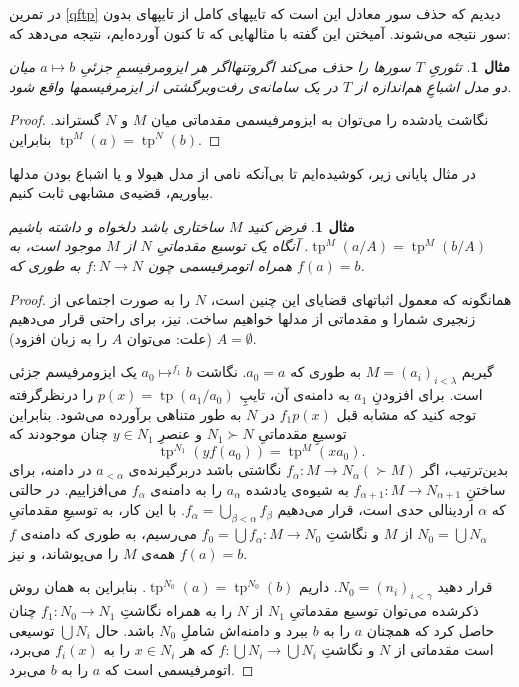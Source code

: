 \documentclass[12pt,a4paper]{report}
\theoremstyle{colorhead}
\newtheorem{mesal}[thm]{مثال}
\DeclareMathOperator{\tp}{tp}
\begin{document}
در تمرین 
\ref{qftp}
 دیدیم که حذف سور معادل این است که تایپهای کامل از تایپهای بدون سور نتیجه می‌شوند. آمیختن این گفته با مثالهایی که تا کنون آورده‌ایم، نتیجه می‌دهد که:
\begin{mesal}
تئوریِ
$T$
سورها را حذف می‌کند اگروتنهااگر هر ایزومرفیسمِ
جزئیِ
$a\mapsto b$
میان دو مدل اشباعِ هم‌اندازه از
$T$
در یک سامانه‌ی رفت‌وبرگشتی از ایزمرفیسمها واقع شود.
\end{mesal}
\begin{proof}
نگاشت یادشده را می‌توان به ایزومرفیسمی مقدماتی میان
$M$
و 
$N$
گستراند. بنابراین
$\tp^M(a)=\tp^N(b)$.
\end{proof}
در مثال پایانی زیر، کوشیده‌ایم تا بی‌آنکه نامی از مدل هیولا و یا اشباع بودن مدلها بیاوریم، قضیه‌ی مشابهی ثابت کنیم.
\begin{mesal}
فرض کنید
$M$
ساختاری باشد دلخواه  و داشته باشیم
$\tp^M(a/A)=\tp^M(b/A)$.
آنگاه یک توسیع مقدماتیِ
$N$
از
$M$
موجود است، به همراه اتومرفیسمی چون
$f:N\to N$
به طوری که
$f(a)=b$.
\end{mesal}
\begin{proof}
همانگونه که معمول اثباتهای قضایای این چنین است،
$N$
را به صورت اجتماعی از زنجیری شمارا و مقدماتی از مدلها خواهیم ساخت. نیز، برای راحتی
قرار می‌دهیم
$A=\emptyset$
(علت: می‌توان 
$A$
را به زبان افزود).
\par 
گیریم
$M=(a_i)_{i<\lambda}$
به طوری که
$a_0=a$.
نگاشت
$a_0\mapsto^{f_1} b$
یک ایزومرفیسم جزئی است. برای افزودنِ
$a_1$
به دامنه‌ی آن، تایپِ
$p(x)=\tp(a_1/a_0)$
را درنظرگرفته توجه کنید که مشابه قبل
$f_1p(x)$
در
$N$
به طور متناهی برآورده می‌شود. بنابراین توسیعِ مقدماتیِ
$N_1\succ N$
و عنصرِ
$y\in N_1$
چنان موجودند که 
\[
\tp^{N_1}(yf(a_0))=\tp^M( xa_0).
\]
بدین‌ترتیب، اگر
$f_\alpha:M\to N_\alpha (\succ M)$
نگاشتی باشد دربرگیرنده‌ی
$a_{<\alpha}$
در دامنه، برای ساختنِ
$f_{\alpha+1}:M\to N_{\alpha+1}$
به شیوه‌ی یادشده
$a_\alpha$
را به دامنه‌ی
$f_\alpha$
می‌افزاییم. در حالتی که
$\alpha$
اردینالی حدی است، قرار می‌‌دهیم
$f_\alpha=\bigcup_{\beta<\alpha} f_\beta$.
با این کار،‌ به توسیعِ مقدماتیِ
$N_0=\bigcup N_\alpha$
از
$M$
و نگاشتِ
$f_0=\bigcup f_\alpha:M\to N_0$
می‌رسیم، به طوری که
دامنه‌ی
$f$
همه‌ی
$M$
را می‌پوشاند، و نیز
$f(a)=b$.
\par
قرار دهید
$N_0=(n_i)_{i<\gamma}$.
داریم
$\tp^{N_0}(a)=\tp^{N_0}(b)$.
بنابراین به همان روش ذکرشده می‌توان توسیع مقدماتیِ
$N_1$
از 
$N$
را به همراه نگاشتِ
$f_1:N_0\to N_1$
چنان حاصل کرد که
همچنان
$a$
را به
$b$
ببرد و دامنه‌اش شاملِ
$N_0$
باشد. حال
$\bigcup N_i$
توسیعی است مقدماتی از
$N$
و 
نگاشتِ
$f:\bigcup N_i\to \bigcup N_i$
که
هر
$x\in N_i$
را به
$f_i(x)$
می‌برد، اتومرفیسمی است که 
$a$
را به 
$b$
می‌برد.
\end{proof}
\pagebreak 
\end{document}
